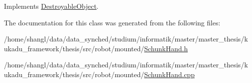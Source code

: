 \-Implements \hyperlink{classDestroyableObject_a728d19d81eca540efd68650867f197be}{\-Destroyable\-Object}.



\-The documentation for this class was generated from the following files\-:\begin{DoxyCompactItemize}
\item 
/home/shangl/data/data\-\_\-synched/studium/informatik/master/master\-\_\-thesis/kukadu\-\_\-framework/thesis/src/robot/mounted/\hyperlink{SchunkHand_8h}{\-Schunk\-Hand.\-h}\item 
/home/shangl/data/data\-\_\-synched/studium/informatik/master/master\-\_\-thesis/kukadu\-\_\-framework/thesis/src/robot/mounted/\hyperlink{SchunkHand_8cpp}{\-Schunk\-Hand.\-cpp}\end{DoxyCompactItemize}
